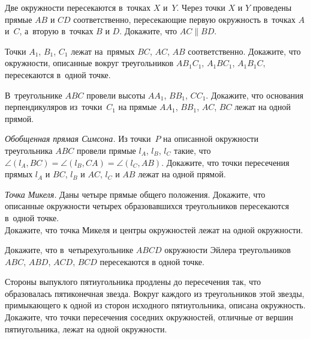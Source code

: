 \begin{problems}

\item
Две окружности пересекаются в~точках $X$ и~$Y$.
Через точки $X$ и $Y$ проведены прямые $AB$ и $CD$ соответственно, пересекающие
первую окружность в~точках $A$ и~$C$, а~вторую в~точках $B$ и $D$.
Докажите, что $AC \parallel BD$.

\item
Точки $A_1$, $B_1$, $C_1$ лежат на~прямых $BC$, $AC$, $AB$ соответственно.
Докажите, что окружности, описанные вокруг треугольников
$A B_1 C_1$, $A_1 B C_1$, $A_1 B_1 C$, пересекаются в~одной точке.

\item
В~треугольнике $ABC$ провели высоты $A A_1$, $B B_1$, $C C_1$.
Докажите, что основания перпендикуляров из~точки~$C_1$ на прямые
$A A_1$, $B B_1$, $AC$, $BC$ лежат на одной прямой.

\item\emph{Обобщенная прямая Симсона.}
Из точки~$P$ на описанной окружности треугольника $ABC$ провели прямые
$l_A$, $l_B$, $l_C$ такие, что
$\angle (l_A, BC) = \angle (l_B, CA) = \angle (l_C, AB)$.
Докажите, что точки пересечения прямых $l_A$ и $BC$, $l_B$ и $AC$, $l_C$ и $AB$
лежат на одной прямой.

\item
\subproblem\emph{Точка Микеля.}
Даны четыре прямые общего положения.
Докажите, что описанные окружности четырех образовавшихся треугольников
пересекаются в~одной точке.
\\
\subproblem
Докажите, что точка Микеля и центры окружностей лежат на одной окружности.

\item
Докажите, что в~четырехугольнике $ABCD$ окружности Эйлера треугольников
$ABC$, $ABD$, $ACD$, $BCD$ пересекаются в одной точке.

\item
Стороны выпуклого пятиугольника продлены до пересечения так, что образовалась
пятиконечная звезда.
Вокруг каждого из треугольников этой звезды, примыкающего к одной из сторон
исходного пятиугольника, описана окружность.
Докажите, что точки пересечения соседних окружностей, отличные от вершин
пятиугольника, лежат на одной окружности.

\end{problems}

